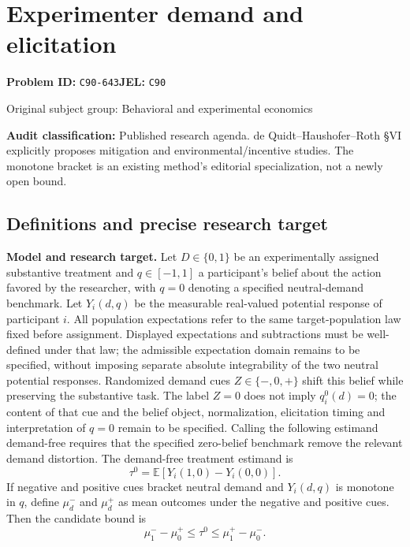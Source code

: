 \documentclass[11pt,a4paper]{article}
\begin{document}
\section*{Experimenter demand and elicitation}
\textbf{Problem ID:} \texttt{C90-643}\quad \textbf{JEL:} \texttt{C90}\par
\label{problem:OP-0307}
{\sffamily\small\color{muted}Original subject group: Behavioral and experimental economics\par}
\label{definitions:problem:30007589}
\textbf{Audit classification:} Published research agenda. de Quidt–Haushofer–Roth §VI explicitly proposes mitigation and environmental/incentive studies. The monotone bracket is an existing method’s editorial specialization, not a newly open bound.
\subsection*{Definitions and precise research target}
\textbf{Model and research target.} Let \(D\in\{0,1\}\) be an experimentally assigned substantive treatment and \(q\in[-1,1]\) a participant's belief about the action favored by the researcher, with \(q=0\) denoting a specified neutral-demand benchmark. Let \(Y_i(d,q)\) be the measurable real-valued potential response of participant \(i\). All population expectations refer to the same target-population law fixed before assignment. Displayed expectations and subtractions must be well-defined under that law; the admissible expectation domain remains to be specified, without imposing separate absolute integrability of the two neutral potential responses. Randomized demand cues \(Z\in\{-,0,+\}\) shift this belief while preserving the substantive task. The label \(Z=0\) does not imply \(q_i^0(d)=0\); the content of that cue and the belief object, normalization, elicitation timing and interpretation of \(q=0\) remain to be specified. Calling the following estimand demand-free requires that the specified zero-belief benchmark remove the relevant demand distortion. The demand-free treatment estimand is
\[\tau^0=\mathbb E[Y_i(1,0)-Y_i(0,0)].\]
If negative and positive cues bracket neutral demand and \(Y_i(d,q)\) is monotone in \(q\), define \(\mu_d^-\) and \(\mu_d^+\) as mean outcomes under the negative and positive cues. Then the candidate bound is
\[\mu_1^- -\mu_0^+\leq\tau^0\leq\mu_1^+ -\mu_0^-.\]
\end{document}
